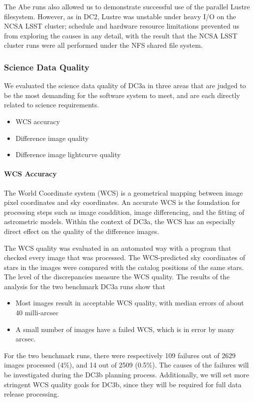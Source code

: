 The Abe runs also allowed us to demonstrate successful use of the 
parallel Lustre filesystem. However, as in DC2, Lustre was unstable 
under heavy I/O on the NCSA LSST cluster; schedule and hardware
resource limitations prevented us from exploring the causes in 
any detail, with the result that the NCSA LSST cluster runs were all
performed under the NFS shared file system. 

\subsubsection*{Science Data Quality}
We evaluated the science data quality of DC3a in three areas that are
judged to be the most demanding for the software system to meet, 
and are each directly related to science requirements. 
\begin{itemize}
\item WCS accuracy
\item Difference image quality
\item Difference image lightcurve quality
\end{itemize}
\paragraph{WCS Accuracy}
The World Coordinate system (WCS) is a geometrical mapping between
image pixel coordinates and sky coordinates.  An accurate WCS is the
foundation for processing steps such as image coaddition, image differencing, and the
fitting of
astrometric models. Within the context of DC3a, the WCS has an
especially direct effect on the quality of the difference images. 

The WCS quality was evaluated in an automated way with a program that
checked every image that was processed.  The WCS-predicted sky
coordinates of stars in the images were compared with the catalog
positions of the same stars.  The level of the discrepancies measure the WCS quality.
The results of the analysis for the two benchmark DC3a runs show that
\begin{itemize}
\item Most images result in acceptable WCS quality, with median errors
  of about 40 milli-arcsec
\item A small number of images have a failed WCS, which is in error by
  many arcsec.
\end{itemize}
For the two benchmark runs, there were respectively 109 failures out
of 2629 images processed (4\%), and 14 out of 2509 (0.5\%).  The
causes of the failures will be investigated during the DC3b planning
process.  Additionally, we will set more stringent WCS quality goals
for DC3b, since they will be required for full data release processing.



